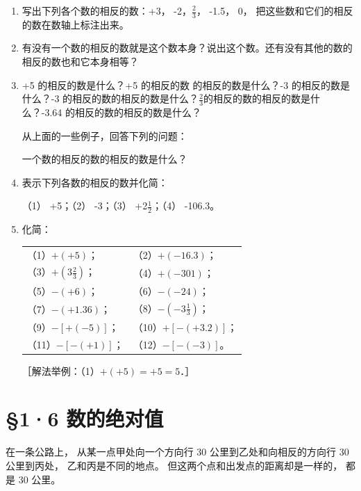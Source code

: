 \begin{enumerate}
\item
  写出下列各个数的相反的数：+3， -2，\(\frac{2}{3}\)， -1.5， 0，
  把这些数和它们的相反的数在数轴上标注出来。
\item
  有没有一个数的相反的数就是这个数本身？说出这个数。还有没有其他的数的相反的数也和它本身相等？
\item
  +5 的相反的数是什么？+5 的相反的数 的相反的数是什么？-3
  的相反的数是什么？-3
  的相反的数的相反的数是什么？\(\frac{2}{3}\)的相反的数的相反的数是什么？-3.64
  的相反的数的相反的数是什么？
  \par\smallskip
  从上面的一些例子，回答下列的问题：
  \par
  一个数的相反的数的相反的数是什么？
\item
  表示下列各数的相反的数并化简：
  \par\smallskip
  （1） +5；\qquad （2） -3；\qquad （3） +2\(\frac{1}{2}\)；\qquad （4） -106.3。
\item
  化简：
  \par\smallskip
  \begin{tabular}{@{}ll@{}}
  （1）\(+(+5)\)； & （2）\(+(-16.3)\)； \\[4pt]
  （3）\(+\left(3\frac{2}{3}\right)\)； & （4）\(+(-301)\)； \\[4pt]
  （5）\(-( +6)\)； & （6）\(-(-24)\)； \\[4pt]
  （7）\(-( +1.36)\)； & （8）\(-\left(-3\frac{1}{3}\right)\)； \\[4pt]
  （9）\(-[+(-5)]\)； & （10）\(+[-(+3.2)]\)； \\[4pt]
  （11）\(-[- (+1)]\)； & （12）\(-[-(-3)]\)。
  \end{tabular}
  \par\smallskip
  ［解法举例：（1）\(+(+5) = +5 = 5\)．］
\end{enumerate}

\section{§1·6 数的绝对值}

在一条公路上， 从某一点甲处向一个方向行 30 公里到乙处和向相反的方向行 30
公里到丙处， 乙和丙是不同的地点。 但这两个点和出发点的距离却是一样的，
都是 30 公里。


